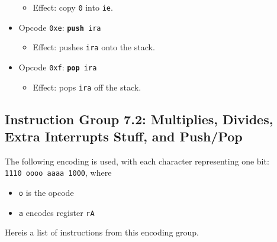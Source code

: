\documentclass{article}
\begin{document}
\begin{itemize}
\begin{itemize}
			\item Effect:  copy \texttt{0} into \texttt{ie}.
		\end{itemize}
		\item Opcode \texttt{0xe}:
			\texttt{\textbf{push} ira}
		\begin{itemize}
			\item Effect:  pushes \texttt{ira} onto the stack.
		\end{itemize}
		\item Opcode \texttt{0xf}:
			\texttt{\textbf{pop} ira}
		\begin{itemize}
			\item Effect:  pops \texttt{ira} off the stack.
		\end{itemize}
	\end{itemize}
	\doublespacing

	\subsection{Instruction Group 7.2:  Multiplies, Divides,
	Extra Interrupts Stuff, and Push/Pop}
	The following encoding is used, with each character representing one
	bit:  \\
	\texttt{1110 oooo aaaa 1000}, where

	\singlespacing
	\begin{itemize}
		\item \texttt{o} is the opcode
		\item \texttt{a} encodes register \texttt{rA}
	\end{itemize}
	\doublespacing

	Hereis a list of instructions from this encoding group.
\end{document}
